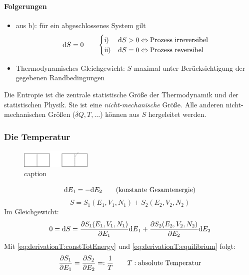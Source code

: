 \paragraph{Folgerungen}
\begin{itemize}
    \item aus b): für ein abgeschlossenes System gilt
    \begin{equation}
        \mathrm{d} S = 0 \qquad
        \begin{cases}
            \text{i) } & \mathrm{d} S > 0 \Leftrightarrow \text{Prozess irreversibel} \\
            \text{ii)} & \mathrm{d} S = 0 \Leftrightarrow \text{Prozess reversibel}
        \end{cases}
    \end{equation}
    \item Thermodynamisches Gleichgewicht: $S$ maximal unter Berücksichtigung der gegebenen Randbedingungen
\end{itemize}
Die Entropie ist die zentrale statistische Größe der Thermodynamik und der statistischen Physik. Sie ist eine \emph{nicht-mechanische} Größe.
Alle anderen nicht-mechanischen Größen ($\delta Q, T, \ldots$) können aus $S$ hergeleitet werden.
\subsubsection{Die Temperatur}
\begin{figure}[H]
    \begin{center}
        \includegraphics[width=0.3\textwidth]{../img/derivationT.pdf}
        \caption{caption}  %
        \label{img:derivationT}
    \end{center}
\end{figure}
\begin{equation}
    \label{eq:derivationT:constTotEnergy}
    \mathrm{d} E_1 = - \mathrm{d} E_2 \qquad \text{(konstante Gesamtenergie)}
\end{equation}
\begin{equation}
    S = S_1(E_1, V_1, N_1) + S_2 (E_2, V_2, N_2)
\end{equation}
Im Gleichgewicht:
\begin{equation}
    \label{eq:derivationT:equilibrium}
    0 = \mathrm{d} S = \frac{\partial S_1(E_1, V_1, N_1)}{\partial E_1} \mathrm{d} E_1 + \frac{\partial S_2 (E_2, V_2, N_2)}{\partial E_2} \mathrm{d} E_2
\end{equation}
Mit \autoref{eq:derivationT:constTotEnergy} und \autoref{eq:derivationT:equilibrium} folgt:
\begin{equation}
    \frac{\partial S_1}{\partial E_1} = \frac{\partial S_2}{\partial E_2} =: \frac{1}{T} \qquad T:\text{absolute Temperatur}
\end{equation}

